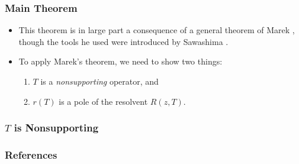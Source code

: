\documentclass{beamer}
\begin{document}
\begin{frame}
	\frametitle{Main Theorem}
	\begin{itemize}
		\item This theorem is in large part a consequence of a general theorem of Marek \cite{Marek1970}, though the tools he used were introduced by Sawashima \cite{Sawashima1964}.
		\pause
		\item To apply Marek's theorem, we need to show two things:
		\begin{enumerate}
			\pause
			\item $T$ is a \emph{nonsupporting} operator, and
			\pause
			\item $r(T)$ is a pole of the resolvent $R(z, T)$.
		\end{enumerate}
	\end{itemize}
\end{frame}

\begin{frame}
	\frametitle{$T$ is Nonsupporting}
		
\end{frame}

\begin{frame}[allowframebreaks]
	\frametitle{References}
		\printbibliography
\end{frame}

\end{document}

